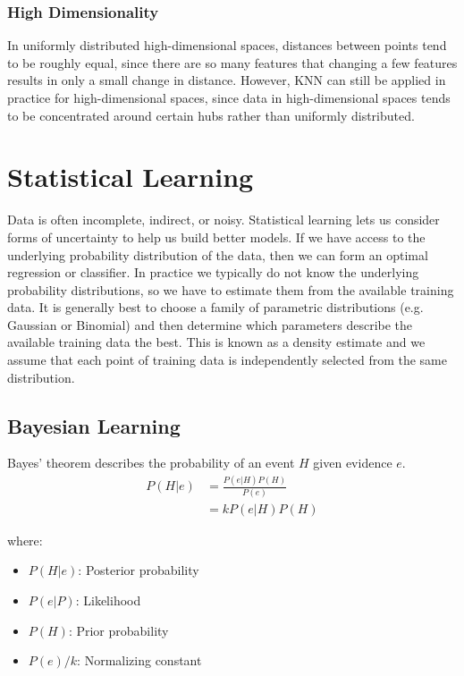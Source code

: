 \documentclass[12pt]{article}
\begin{document}
        \subsubsection{High Dimensionality}
            In uniformly distributed high-dimensional spaces, distances between points tend to be roughly equal, since there are so many features that changing a few
            features results in only a small change in distance. However, KNN can still be applied in practice for high-dimensional spaces, since data in high-dimensional
            spaces tends to be concentrated around certain hubs rather than uniformly distributed.

\section{Statistical Learning}
    Data is often incomplete, indirect, or noisy. Statistical learning lets us consider forms of uncertainty to help us build better models. If we have access to the underlying probability distribution of the data, then we can form 
    an optimal regression or classifier. In practice we typically do not know the underlying probability distributions, so we have to estimate them from the available training data. It is generally best to choose a family of parametric
    distributions (e.g. Gaussian or Binomial) and then determine which parameters describe the available training data the best. This is known as a density estimate and we assume that each point of training data is independently selected
    from the same distribution.

    \subsection{Bayesian Learning}
    Bayes' theorem describes the probability of an event $H$ given evidence $e$.
    \begin{align}
        P(H|e) &= \frac{P(e|H)P(H)}{P(e)} \\
        &= kP(e|H)P(H)
    \end{align}

    where:
    \begin{itemize}
        \item $P(H|e)$: Posterior probability
        \item $P(e|P)$: Likelihood
        \item $P(H)$: Prior probability
        \item $P(e)/k$: Normalizing constant
    \end{itemize}
\end{document}
